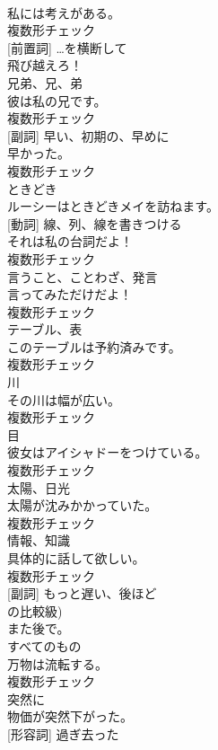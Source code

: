 \documentclass[8pt]{extreport}
\begin{document}
\begin{CJK}{UTF8}{min}
\\	私には考えがある。	
\\	複数形チェック
\\	[副詞] [前置詞]	…を横断して	
\\	飛び越えろ！	
\\	[名詞]	兄弟、兄、弟	
\\	彼は私の兄です。	
\\	複数形チェック
\\	[名詞] [副詞]	早い、初期の、早めに	
\\	早かった。	
\\	複数形チェック
\\	[副詞]	ときどき	
\\	ルーシーはときどきメイを訪ねます。	
\\	[名詞] [動詞]	線、列、線を書きつける	
\\	それは私の台詞だよ！	
\\	複数形チェック
\\	[名詞]	言うこと、ことわざ、発言	
\\	言ってみただけだよ！	
\\	複数形チェック
\\	[名詞]	テーブル、表	
\\	このテーブルは予約済みです。	
\\	複数形チェック
\\	[名詞]	川	
\\	その川は幅が広い。	
\\	複数形チェック
\\	[名詞]	目	
\\	彼女はアイシャドーをつけている。	
\\	複数形チェック
\\	[名詞]	太陽、日光	
\\	太陽が沈みかかっていた。	
\\	複数形チェック
\\	[名詞]	情報、知識	
\\	具体的に話して欲しい。	
\\	複数形チェック
\\	[形容詞] [副詞]	もっと遅い、後ほど 
\\	の比較級)	
\\	また後で。	
\\	[名詞]	すべてのもの	
\\	万物は流転する。	
\\	複数形チェック
\\	[副詞]	突然に	
\\	物価が突然下がった。	
\\	[名詞] [形容詞]	過ぎ去った	

\end{CJK}
\end{document}
